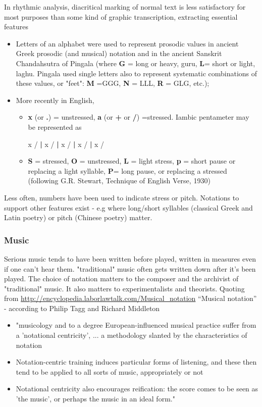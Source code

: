 \documentclass[11pt]{article}
\begin{document}
In rhythmic analysis, diacritical marking of normal text is less satisfactory for most purposes than some kind of graphic transcription, extracting essential features
\begin{itemize}
\item Letters of an alphabet were used to represent prosodic values in ancient Greek prosodic (and musical) notation and in the ancient Sanskrit Chandahsutra of Pingala (where \textbf{G} = long or heavy, guru, \textbf{L}= short or light, laghu. Pingala used single letters also to represent systematic combinations of these values, or "feet": \textbf{M} =GGG, \textbf{N} = LLL, \textbf{R} = GLG, etc.); 
\item More recently in English, 
\begin{itemize}
\item \textbf{x} (or \textbf{.}) = unstressed, \textbf{a} (or \textbf{+} or \textbf{/}) =stressed. Iambic pentameter may be represented as

x / \textbf{|} x / \textbf{|} x / \textbf{|} x / \textbf{|} x /
\item \textbf{S} = stressed, \textbf{O} = unstressed, \textbf{L} = light stress, \textbf{p} = short  pause or replacing a light syllable, \textbf{P}= long pause, or replacing a stressed (following G.R. Stewart, Technique of English Verse, 1930) 

\end{itemize}
\end{itemize}

Less often, numbers have been used to indicate
stress or pitch. Notations to support other features exist - e.g where 
long/short syllables (classical Greek and Latin poetry) or pitch (Chinese
poetry) matter.

\subsubsection*{Music}

Serious music tends to have been written before played, written in measures even if one can't hear them. "traditional" music often gets written down after it's been played. The choice of notation matters to the composer and the archivist of "traditional" music. It also matters to experimentalists and theorists. Quoting from \url{http://encyclopedia.laborlawtalk.com/Musical_notation} ``Musical notation'' - according to Philip Tagg and Richard Middleton
\begin{itemize}
\item "musicology and to a degree European-influenced musical practice suffer from a 'notational centricity', ... a methodology slanted by the characteristics of notation
\item Notation-centric training induces particular forms of listening, and these then tend to be applied to all sorts of music, appropriately or not
\item Notational centricity also encourages reification: the score comes to be seen as 'the music', or perhaps the music in an ideal form."
\end{itemize}
\end{document}
